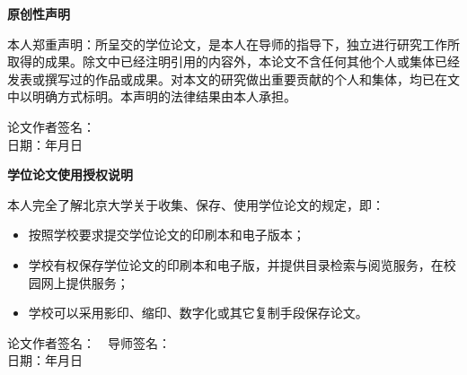 \bigskip

\begin{center}
    \textbf{原创性声明}
\end{center}

本人郑重声明：所呈交的学位论文，是本人在导师的指导下，独立进行研究工作所取得的成果。除文中已经注明引用的内容外，本论文不含任何其他个人或集体已经发表或撰写过的作品或成果。对本文的研究做出重要贡献的个人和集体，均已在文中以明确方式标明。本声明的法律结果由本人承担。

\bigskip

\begin{flushright}
    论文作者签名：\hspace{10em}　\\
    \vspace{1em}
    日期：\hspace{4em}年\hspace{2em}月\hspace{2em}日
\end{flushright}

\bigskip
\bigskip
\bigskip

\begin{center}
    \textbf{学位论文使用授权说明}
\end{center}

本人完全了解北京大学关于收集、保存、使用学位论文的规定，即：
\begin{itemize}
    \item 按照学校要求提交学位论文的印刷本和电子版本；
    \item 学校有权保存学位论文的印刷本和电子版，并提供目录检索与阅览服务，在校园网上提供服务；
    \item 学校可以采用影印、缩印、数字化或其它复制手段保存论文。
\end{itemize}

\bigskip

\begin{flushright}
    论文作者签名：\hspace{5em}　导师签名：\hspace{5em}　\\
    \vspace{1em}
    日期：\hspace{4em}年\hspace{2em}月\hspace{2em}日\hspace{5em}　
\end{flushright}